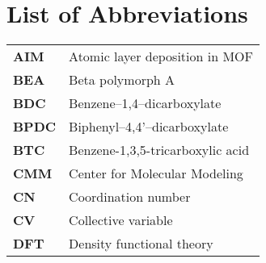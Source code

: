 \chapter{List of Abbreviations}

\vspace{-0.5cm}

\begin{longtable}{p{} p{}}
\hline
\textbf{AIM} & Atomic layer deposition in MOF\\
\textbf{BEA} & Beta polymorph A \\
\textbf{BDC} & Benzene--1,4--dicarboxylate \\
\textbf{BPDC} & Biphenyl--4,4'--dicarboxylate \\
\textbf{BTC} & Benzene-1,3,5-tricarboxylic acid \\
\textbf{CMM} & Center for Molecular Modeling \\
\textbf{CN} & Coordination number \\
\textbf{CV} & Collective variable \\
\textbf{DFT} & Density functional theory \\

\end{longtable}

